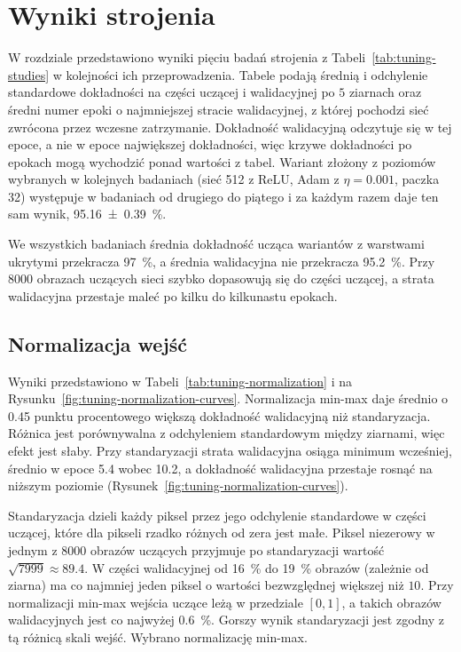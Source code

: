 \section{Wyniki strojenia}
\label{sec:tuning}

W rozdziale przedstawiono wyniki pięciu badań strojenia z Tabeli~\ref{tab:tuning-studies} w kolejności ich przeprowadzenia. Tabele podają średnią i odchylenie standardowe dokładności na części uczącej i walidacyjnej po $5$ ziarnach oraz średni numer epoki o najmniejszej stracie walidacyjnej, z której pochodzi sieć zwrócona przez wczesne zatrzymanie. Dokładność walidacyjną odczytuje się w tej epoce, a nie w epoce największej dokładności, więc krzywe dokładności po epokach mogą wychodzić ponad wartości z tabel. Wariant złożony z poziomów wybranych w kolejnych badaniach (sieć 512 z ReLU, Adam z $\eta = \num{0.001}$, paczka 32) występuje w badaniach od drugiego do piątego i za każdym razem daje ten sam wynik, \qty{95.16 +- 0.39}{\percent}.

We wszystkich badaniach średnia dokładność ucząca wariantów z warstwami ukrytymi przekracza \qty{97}{\percent}, a średnia walidacyjna nie przekracza \qty{95.2}{\percent}. Przy \num{8000} obrazach uczących sieci szybko dopasowują się do części uczącej, a strata walidacyjna przestaje maleć po kilku do kilkunastu epokach.

\subsection{Normalizacja wejść}
\label{sec:tuning-normalization}

Wyniki przedstawiono w Tabeli~\ref{tab:tuning-normalization} i na Rysunku~\ref{fig:tuning-normalization-curves}. Normalizacja min-max daje średnio o \num{0.45} punktu procentowego większą dokładność walidacyjną niż standaryzacja. Różnica jest porównywalna z odchyleniem standardowym między ziarnami, więc efekt jest słaby. Przy standaryzacji strata walidacyjna osiąga minimum wcześniej, średnio w epoce \num{5.4} wobec \num{10.2}, a dokładność walidacyjna przestaje rosnąć na niższym poziomie (Rysunek~\ref{fig:tuning-normalization-curves}).

Standaryzacja dzieli każdy piksel przez jego odchylenie standardowe w części uczącej, które dla pikseli rzadko różnych od zera jest małe. Piksel niezerowy w jednym z \num{8000} obrazów uczących przyjmuje po standaryzacji wartość $\sqrt{7999} \approx \num{89.4}$. W części walidacyjnej od \qty{16}{\percent} do \qty{19}{\percent} obrazów (zależnie od ziarna) ma co najmniej jeden piksel o wartości bezwzględnej większej niż $10$. Przy normalizacji min-max wejścia uczące leżą w przedziale $[0, 1]$, a takich obrazów walidacyjnych jest co najwyżej \qty{0.6}{\percent}. Gorszy wynik standaryzacji jest zgodny z tą różnicą skali wejść. Wybrano normalizację min-max.


